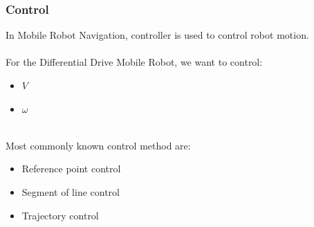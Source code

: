 \begin{frame}
	\frametitle{Control}
	In Mobile Robot Navigation, controller is used to control robot motion.\\ \pause
	\hspace{\linewidth}\\
	For the Differential Drive Mobile Robot, we want to control:
	\begin{itemize}
		\item \(V\)
		\item \(\omega\)
	\end{itemize}
	\pause
	\hspace{\linewidth}\\
	Most commonly known control method are:
	\begin{itemize}
		\item Reference point control
		\item Segment of line control
		\item Trajectory control
	\end{itemize}
\end{frame}


